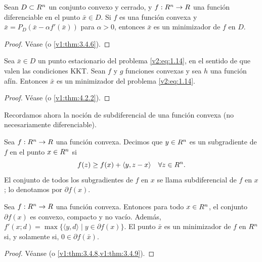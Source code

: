 \begin{theorem}\label{v2:thm:1.3.7}
    Sean $D \subset R^n$ un conjunto convexo y cerrado, y $f : R^n \to R$ una función diferenciable en el punto $\bar{x} \in D$. Si $f$ es una función convexa y $\bar{x} = P_D(\bar{x} - \alpha f'(\bar{x}))$ para $\alpha > 0$, entonces $\bar{x}$ es un minimizador de $f$ en $D$.
\end{theorem}

\begin{proof}
    Véase \cite{izmailov2020otimizacaovolume1} (o \cref{v1:thm:3.4.6}).
\end{proof}

\begin{theorem}\label{v2:thm:1.3.8}
    Sea $\bar{x} \in D$ un punto estacionario del problema \eqref{v2:eq:1.14}, en el sentido de que valen las condiciones KKT. Sean $f$ y $g$ funciones convexas y sea $h$ una función afín. Entonces $\bar{x}$ es un minimizador del problema \eqref{v2:eq:1.14}.
\end{theorem}

\begin{proof}
    Véase \cite{izmailov2020otimizacaovolume1} (o \cref{v1:thm:4.2.2}).
\end{proof}

Recordamos ahora la noción de subdiferencial de una función convexa (no necesariamente diferenciable).

\begin{definition}\label{v2:def:1.3.4}
    Sea $f : R^n \to R$ una función convexa. Decimos que $y \in R^n$ es un subgradiente de $f$ en el punto $x \in R^n$ si
    \[
        f(z) \ge f(x) + \langle y, z - x \rangle \quad \forall z \in R^n.
    \]
    El conjunto de todos los subgradientes de $f$ en $x$ se llama subdiferencial de $f$ en $x$; lo denotamos por $\partial f(x)$.
\end{definition}

\begin{theorem}\label{v2:thm:1.3.9}
    Sea $f : R^n \to R$ una función convexa. Entonces para todo $x \in R^n$, el conjunto $\partial f(x)$ es convexo, compacto y no vacío. Además, $f'(x; d) = \max \{ \langle y, d \rangle \mid y \in \partial f(x) \}$. El punto $\bar{x}$ es un minimizador de $f$ en $R^n$ si, y solamente si, $0 \in \partial f(\bar{x})$.
\end{theorem}

\begin{proof}
    Véanse \cite{izmailov2020otimizacaovolume1} (o \cref{v1:thm:3.4.8,v1:thm:3.4.9}).
\end{proof}

